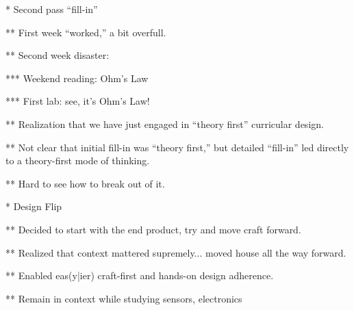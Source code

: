 * Second pass ``fill-in''

** First week ``worked,'' a bit overfull.

** Second week disaster:

*** Weekend reading: Ohm's Law

*** First lab: see, it's Ohm's Law!

** Realization that we have just engaged in ``theory first'' curricular design.

** Not clear that initial fill-in was ``theory first,'' but detailed ``fill-in'' led directly to a theory-first mode of thinking.

** Hard to see how to break out of it.

* Design Flip

** Decided to start with the end product, try and move craft forward.

** Realized that context mattered supremely... moved house all the way forward.

** Enabled eas(y|ier) craft-first and hands-on design adherence. 

** Remain in context while studying sensors, electronics

